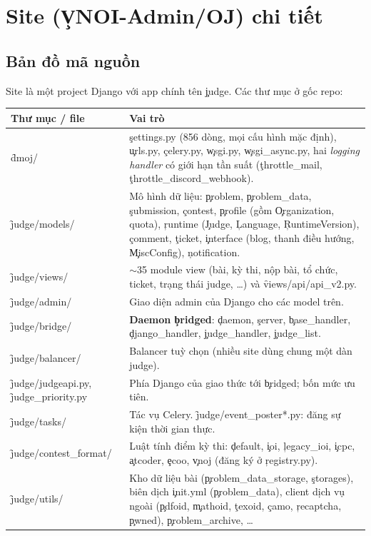 \section{Site \texorpdfstring{(\c{VNOI-Admin/OJ})}{(OJ)} chi tiết}\label{sec:site}

\subsection{Bản đồ mã nguồn}
Site là một project Django với app chính tên \c{judge}. Các thư mục ở gốc repo:
\begin{center}\small
\begin{tabularx}{\textwidth}{@{}L{3.3cm}Y@{}}
\toprule
Thư mục / file & Vai trò \\
\midrule
\f{dmoj/} & \c{settings.py} (856 dòng, mọi cấu hình mặc định), \c{urls.py}, \c{celery.py}, \c{wsgi.py}, \c{wsgi_async.py}, hai \emph{logging handler} có giới hạn tần suất (\c{throttle_mail}, \c{throttle_discord_webhook}). \\
\f{judge/models/} & Mô hình dữ liệu: \c{problem}, \c{problem_data}, \c{submission}, \c{contest}, \c{profile} (gồm \c{Organization}, quota), \c{runtime} (\c{Judge}, \c{Language}, \c{RuntimeVersion}), \c{comment}, \c{ticket}, \c{interface} (blog, thanh điều hướng, \c{MiscConfig}), \c{notification}. \\
\f{judge/views/} & ${\sim}$35 module view (bài, kỳ thi, nộp bài, tổ chức, ticket, trạng thái judge, \ldots) và \f{views/api/api_v2.py}. \\
\f{judge/admin/} & Giao diện admin của Django cho các model trên. \\
\f{judge/bridge/} & \textbf{Daemon \c{bridged}}: \c{daemon}, \c{server}, \c{base_handler}, \c{django_handler}, \c{judge_handler}, \c{judge_list}. \\
\f{judge/balancer/} & Balancer tuỳ chọn (nhiều site dùng chung một dàn judge). \\
\f{judge/judgeapi.py}, \f{judge_priority.py} & Phía Django của giao thức tới \c{bridged}; bốn mức ưu tiên. \\
\f{judge/tasks/} & Tác vụ Celery. \f{judge/event_poster*.py}: đăng sự kiện thời gian thực. \\
\f{judge/contest_format/} & Luật tính điểm kỳ thi: \c{default}, \c{ioi}, \c{legacy_ioi}, \c{icpc}, \c{atcoder}, \c{ecoo}, \c{vnoj} (đăng ký ở \c{registry.py}). \\
\f{judge/utils/} & Kho dữ liệu bài (\c{problem_data_storage}, \c{storages}), biên dịch \c{init.yml} (\c{problem_data}), client dịch vụ ngoài (\c{pdfoid}, \c{mathoid}, \c{texoid}, \c{camo}, \c{recaptcha}, \c{pwned}), \c{problem_archive}, \ldots \\

\end{tabularx}
\end{center}
